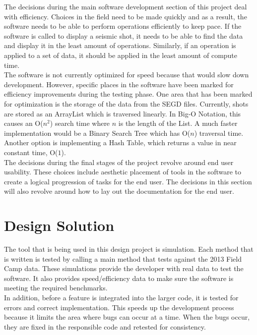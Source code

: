 \documentclass[12pt]{article}
\begin{document}
The decisions during the main software development section of this project deal with efficiency. Choices in the field need to be made quickly and as a result, the software needs to be able to perform operations efficiently to keep pace. If the software is called to display a seismic shot, it needs to be able to find the data and display it in the least amount of operations. Similarly, if an operation is applied to a set of data, it should be applied in the least amount of compute time. \\

The software is not currently optimized for speed because that would slow down development. However, specific places in the software have been marked for efficiency improvements during the testing phase. One area that has been marked for optimization is the storage of the data from the SEGD files. Currently, shots are stored as an ArrayList which is traversed linearly. In Big-O Notation, this causes an O($n^2$) search time where $n$ is the length of the List. A much faster implementation would be a Binary Search Tree which has O($n$) traversal time. Another option is implementing a Hash Table, which returns a value in near constant time, O($1$). \\

The decisions during the final stages of the project revolve around end user usability. These choices include aesthetic placement of tools in the software to create a logical progression of tasks for the end user. The decisions in this section will also revolve around how to lay out the documentation for the end user.

\section{Design Solution}

The tool that is being used in this design project is simulation. Each method that is written is tested by calling a main method that tests against the 2013 Field Camp data. These simulations provide the developer with real data to test the software. It also provides speed/efficiency data to make sure the software is meeting the required benchmarks. \\

In addition, before a feature is integrated into the larger code, it is tested for errors and correct implementation. This speeds up the development process because it limits the area where bugs can occur at a time. When the bugs occur, they are fixed in the responsible code and retested for consistency. \\ 
\end{document}

